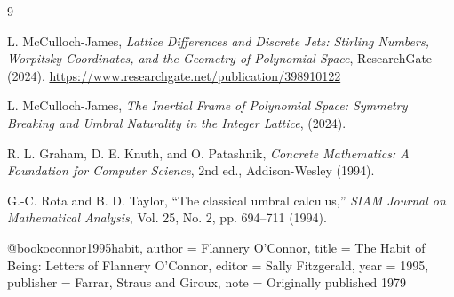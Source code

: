 \documentclass[a5paper,11pt,twoside,onecolumn,openany,extrafontsizes,final]{memoir}%
\begin{document}






%

% 






\newpage\phantom{blabla}
\pagestyle{empty}


\begin{thebibliography}{9}

L. McCulloch-James, \emph{Lattice Differences and Discrete Jets: Stirling Numbers, Worpitsky Coordinates, and the Geometry of Polynomial Space}, ResearchGate (2024). \url{https://www.researchgate.net/publication/398910122}

L. McCulloch-James, \emph{The Inertial Frame of Polynomial Space: Symmetry Breaking and Umbral Naturality in the Integer Lattice}, (2024).

R. L. Graham, D. E. Knuth, and O. Patashnik, \emph{Concrete Mathematics: A Foundation for Computer Science}, 2nd ed., Addison-Wesley (1994).

G.-C. Rota and B. D. Taylor, ``The classical umbral calculus,'' \emph{SIAM Journal on Mathematical Analysis}, Vol. 25, No. 2, pp. 694--711 (1994).

\end{thebibliography}

@book{oconnor1995habit,
  author    = {Flannery O'Connor},
  title     = {The Habit of Being: Letters of Flannery O'Connor},
  editor    = {Sally Fitzgerald},
  year      = {1995},
  publisher = {Farrar, Straus and Giroux},
  note      = {Originally published 1979}}
\end{document}

